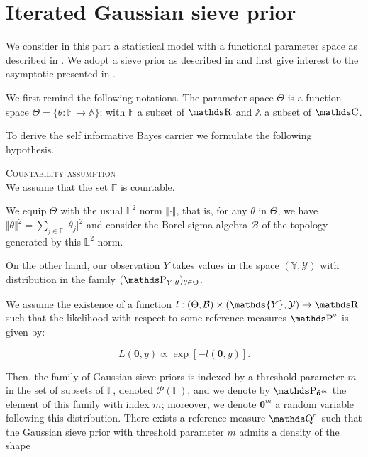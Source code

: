 \section{Iterated Gaussian sieve prior}\label{BAYES_SIEVE}

We consider in this part a statistical model with a functional parameter space as described in .
We adopt a sieve prior as described in  and first give interest to the asymptotic presented in .

\medskip

We first remind the following notations.
The parameter space $\Theta$ is a function space $\Theta = \{ \theta : \mathds{F} \rightarrow \mathds{A} \}$; with $\mathds{F}$ a subset of $\R$ and $\mathds{A}$ a subset of $\C$.

To derive the self informative Bayes carrier we formulate the following hypothesis.

\begin{as}{\textsc{Countability assumption}\\}\label{AS_BAYES_SIEVE_COUNTABLE}
We assume that the set $\mathds{F}$ is countable.
\end{as}

We equip $\Theta$ with the usual $\mathds{L}^{2}$ norm $\Vert \cdot \Vert$, that is, for any $\theta$ in $\Theta$, we have $\Vert \theta \Vert^{2} = \sum\limits_{j \in \mathds{F}} \vert \theta_{j} \vert^{2}$ and consider the Borel sigma algebra $\mathcal{B}$ of the topology generated by this $\mathds{L}^{2}$ norm.

On the other hand, our observation $Y$ takes values in the space $(\mathds{Y}, \mathcal{Y})$ with distribution in the family $(\P_{Y \vert \theta})_{\theta \in \Theta}$.


We assume the existence of a function $l: (\Theta, \mathcal{B}) \times (\mathds{Y}, \mathcal{Y}) \rightarrow \R$ such that the likelihood with respect to some reference measures $\P^{\circ}$ is given by:

\[L(\boldsymbol{\theta}, y) \propto \exp\left[-l(\boldsymbol{\theta}, y)\right].\]

Then, the family of Gaussian sieve priors is indexed by a threshold parameter $m$ in the set of subsets of $\mathds{F}$, denoted $\mathcal{P}(\mathds{F})$, and we denote by $\P_{\boldsymbol{\theta}^{m}}$ the element of this family with index $m$; moreover, we denote $\boldsymbol{\theta}^{m}$ a random variable following this distribution. 
There exists a reference measure $\Q^{\circ}$ such that the Gaussian sieve prior with threshold parameter $m$ admits a density of the shape

